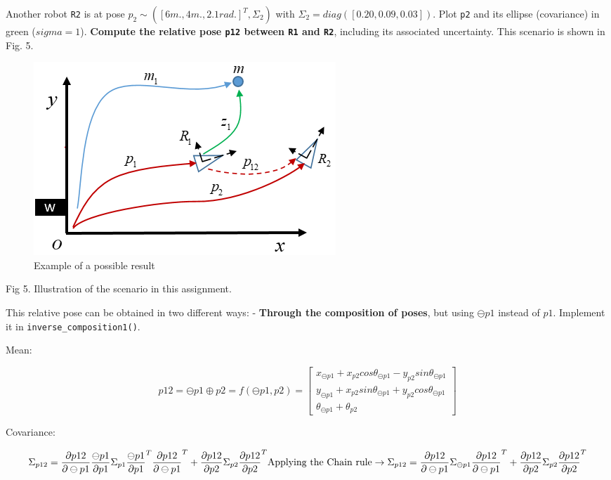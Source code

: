 \documentclass[11pt]{article}
\begin{document}
Another robot \texttt{R2} is at pose
\(p_2 \sim ([6m., 4m., 2.1rad.]^T, \Sigma_2)\) with
\(\Sigma_2 = diag([0.20,0.09,  0.03])\). Plot \texttt{p2} and its
ellipse (covariance) in green (\(sigma=1\)). \textbf{Compute the
relative pose \texttt{p12} between \texttt{R1} and \texttt{R2}},
including its associated uncertainty. This scenario is shown in Fig. 5.

\begin{figure}
\centering
\includegraphics{images/assignment_3.png}
\caption{Example of a possible result}
\end{figure}
Fig 5. Illustration of the scenario in this assignment.

This relative pose can be obtained in two different ways: -
\textbf{Through the composition of poses}, but using \(\ominus p1\)
instead of \(p1\). Implement it in \texttt{inverse\_composition1()}.

Mean:

\[
 p12 = \ominus p1 \oplus p2 = f(\ominus p1, p2) = 
 \begin{bmatrix} 
  x_{\ominus p1} + x_{p2} cos \theta_{\ominus p1} - y_{p2} sin \theta_{\ominus p1} \\
  y_{\ominus p1} + x_{p2} sin \theta_{\ominus p1} + y_{p2} cos \theta_{\ominus p1} \\
  \theta_{\ominus p1} + \theta_{p2}
 \end{bmatrix}
 \]

Covariance:

\[
 \Sigma_{p12} = \frac{\partial p12}{\partial \ominus p1} \frac{\ominus p1}{\partial p1} \Sigma_{p1} \frac{\ominus p1}{\partial p1}^T \frac{\partial p12}{\partial \ominus p1}^T 
 +
 \frac{\partial p12}{\partial p2} \Sigma_{p2}  \frac{\partial p12}{\partial p2}^T
 \\
 \text{Applying the Chain rule} \rightarrow \Sigma_{p12} = \frac{\partial p12}{\partial \ominus p1} \Sigma_{\ominus p1} \frac{\partial p12}{\partial \ominus p1}^T
 +
 \frac{\partial p12}{\partial p2} \Sigma_{p2}  \frac{\partial p12}{\partial p2}^T
 \]
\end{document}
